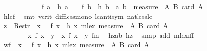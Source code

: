 \begin{isabellebody}
\ \ \ \ \ \ \ \ \ \ {}\ {\isacharasterisk}{\kern0pt}\ f\ a\ {\isacharminus}{\kern0pt}\ h\ a\ {\isacharequal}{\kern0pt}\ {}\ {\isacharasterisk}{\kern0pt}\ f\ b\ {\isacharminus}{\kern0pt}\ h\ b\ {\isasymand}\ {\isacharparenleft}{\kern0pt}a{\isacharcomma}{\kern0pt}\ b{\isacharparenright}{\kern0pt}\ {\isasymin}\ measure\ {\isacharparenleft}{\kern0pt}{\isasymlambda}\ {\isacharparenleft}{\kern0pt}A{\isacharcomma}{\kern0pt}\ B{\isacharparenright}{\kern0pt}{\isachardot}{\kern0pt}\ card\ A{\isacharparenright}{\kern0pt}{\isachardoublequoteclose}\ \isanewline
\ \ \ \ \ \ \ \ \ \ \isamarkupfalse%
\ hle{}f\ \isamarkupfalse%
\ {\isacharparenleft}{\kern0pt}smt\ {\isacharparenleft}{\kern0pt}verit{\isacharparenright}{\kern0pt}\ diff{\isacharunderscore}{\kern0pt}less{\isacharunderscore}{\kern0pt}mono{}\ le{\isacharunderscore}{\kern0pt}antisym\ nat{\isacharunderscore}{\kern0pt}less{\isacharunderscore}{\kern0pt}le{\isacharparenright}{\kern0pt}\isanewline
\ \ \ \ \ \ \ \ \isamarkupfalse%
\ \isamarkupfalse%
\ {\isachardoublequoteopen}z\ {\isasymin}\ Restr\ {\isacharparenleft}{\kern0pt}{\isacharparenleft}{\kern0pt}{\isacharparenleft}{\kern0pt}{\isasymlambda}\ x{\isachardot}{\kern0pt}\ {}\ {\isacharasterisk}{\kern0pt}\ f\ x\ {\isacharminus}{\kern0pt}\ h\ x{\isacharparenright}{\kern0pt}\ {\isacharless}{\kern0pt}{\isacharasterisk}{\kern0pt}mlex{\isacharasterisk}{\kern0pt}{\isachargreater}{\kern0pt}\ measure\ {\isacharparenleft}{\kern0pt}{\isasymlambda}\ {\isacharparenleft}{\kern0pt}A{\isacharcomma}{\kern0pt}\ B{\isacharparenright}{\kern0pt}{\isachardot}{\kern0pt}\ card\ A{\isacharparenright}{\kern0pt}{\isacharparenright}{\kern0pt}\ {\isasyminter}\ \isanewline
\ \ \ \ \ \ \ \ {\isacharbraceleft}{\kern0pt}x{\isachardot}{\kern0pt}\ f\ x\ {\isacharequal}{\kern0pt}\ y{\isacharbraceright}{\kern0pt}\ {\isasymtimes}\ {\isacharbraceleft}{\kern0pt}x{\isachardot}{\kern0pt}\ f\ x\ {\isacharequal}{\kern0pt}\ y{\isacharbraceright}{\kern0pt}{\isacharparenright}{\kern0pt}\ {\isacharquery}{\kern0pt}fin{\isachardoublequoteclose}\ \isamarkupfalse%
\ hzab\ hz\ \isamarkupfalse%
\ {\isacharparenleft}{\kern0pt}simp\ add{\isacharcolon}{\kern0pt}\ mlex{\isacharunderscore}{\kern0pt}iff{\isacharparenright}{\kern0pt}\isanewline
\ \ \ \ \ \ \isamarkupfalse%
\isanewline
\ \ \ \ \ \ \isamarkupfalse%
\ \isamarkupfalse%
\ {\isachardoublequoteopen}wf\ {\isacharparenleft}{\kern0pt}{\isacharparenleft}{\kern0pt}{\isasymlambda}\ x{\isachardot}{\kern0pt}\ {}\ {\isacharasterisk}{\kern0pt}\ f\ x\ {\isacharminus}{\kern0pt}\ h\ x{\isacharparenright}{\kern0pt}\ {\isacharless}{\kern0pt}{\isacharasterisk}{\kern0pt}mlex{\isacharasterisk}{\kern0pt}{\isachargreater}{\kern0pt}\ measure\ {\isacharparenleft}{\kern0pt}{\isasymlambda}\ {\isacharparenleft}{\kern0pt}A{\isacharcomma}{\kern0pt}\ B{\isacharparenright}{\kern0pt}{\isachardot}{\kern0pt}\ card\ A{\isacharparenright}{\kern0pt}{\isacharparenright}{\kern0pt}{\isachardoublequoteclose}\isanewline

\end{isabellebody}
